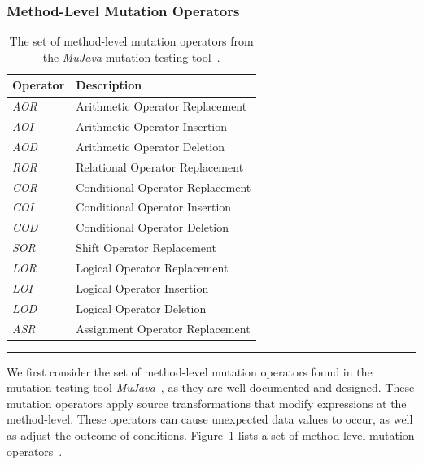 \subsubsection{Method-Level Mutation Operators}
\label{subsubsec:background_method_operators}
\begin{table}[!tb]
  \centering
  \begin{tabular}{|l|l|}
    \hline
    \rowcolor[RGB]{169,196,223}
    \textbf{Operator} & \textbf{Description} \\
    \hline \emph{AOR} & Arithmetic Operator Replacement \\
    \hline \emph{AOI} & Arithmetic Operator Insertion \\
    \hline \emph{AOD} & Arithmetic Operator Deletion \\
    \hline \emph{ROR} & Relational Operator Replacement \\
    \hline \emph{COR} & Conditional Operator Replacement \\
    \hline \emph{COI} & Conditional Operator Insertion \\
    \hline \emph{COD} & Conditional Operator Deletion \\
    \hline \emph{SOR} & Shift Operator Replacement \\
    \hline \emph{LOR} & Logical Operator Replacement \\
    \hline \emph{LOI} & Logical Operator Insertion \\
    \hline \emph{LOD} & Logical Operator Deletion \\
    \hline \emph{ASR} & Assignment Operator Replacement \\
    \hline
  \end{tabular}
  \caption{The set of method-level mutation operators from the \emph{MuJava} mutation testing tool~\cite{MOK05, MO05a}.}
  \label{tab:method_operators}
  \vspace{2mm}
  \hrule
\end{table}

We first consider the set of method-level mutation operators found in the mutation testing tool \emph{MuJava}~\cite{MOK05}, as they are well documented and designed. These mutation operators apply source transformations that modify expressions at the method-level. These operators can cause unexpected data values to occur, as well as adjust the outcome of conditions. Figure~\ref{tab:method_operators} lists a set of method-level mutation operators~\cite{MO05a}.

